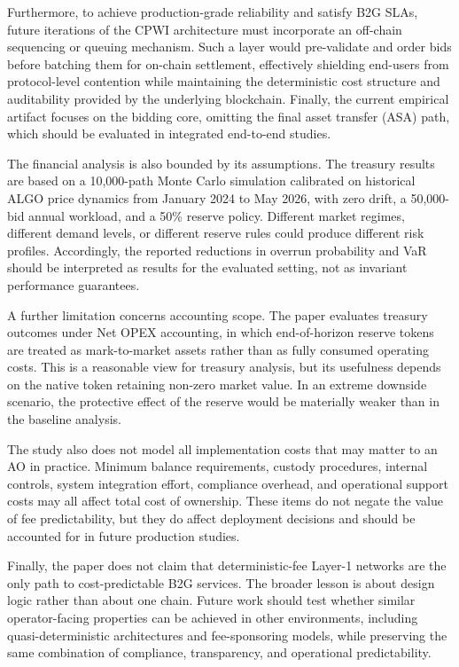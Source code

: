 \documentclass[runningheads]{llncs}
\begin{document}
Furthermore, to achieve production-grade reliability and satisfy B2G SLAs, future iterations of the CPWI architecture must incorporate an off-chain sequencing or queuing mechanism. Such a layer would pre-validate and order bids before batching them for on-chain settlement, effectively shielding end-users from protocol-level contention while maintaining the deterministic cost structure and auditability provided by the underlying blockchain. Finally, the current empirical artifact focuses on the bidding core, omitting the final asset transfer (ASA) path, which should be evaluated in integrated end-to-end studies.

The financial analysis is also bounded by its assumptions. The treasury results
are based on a 10{,}000-path Monte Carlo simulation calibrated on historical ALGO price dynamics from January 2024 to May 2026, with zero drift, a
50{,}000-bid annual workload, and a 50\% reserve policy. Different market
regimes, different demand levels, or different reserve rules could produce
different risk profiles. Accordingly, the reported reductions in overrun
probability and VaR should be interpreted as results for the evaluated setting,
not as invariant performance guarantees.

A further limitation concerns accounting scope. The paper evaluates treasury
outcomes under Net OPEX accounting, in which end-of-horizon reserve tokens are
treated as mark-to-market assets rather than as fully consumed operating costs.
This is a reasonable view for treasury analysis, but its usefulness depends on
the native token retaining non-zero market value. In an extreme downside
scenario, the protective effect of the reserve would be materially weaker than in
the baseline analysis.

The study also does not model all implementation costs that may matter to an
AO in practice. Minimum balance requirements, custody procedures, internal
controls, system integration effort, compliance overhead, and operational support
costs may all affect total cost of ownership. These items do not negate the value
of fee predictability, but they do affect deployment decisions and should be
accounted for in future production studies.

Finally, the paper does not claim that deterministic-fee Layer-1 networks are the
only path to cost-predictable B2G services. The broader lesson is about design
logic rather than about one chain. Future work should test whether similar
operator-facing properties can be achieved in other environments, including
quasi-deterministic architectures and fee-sponsoring models, while preserving the
same combination of compliance, transparency, and operational predictability.
\end{document}

